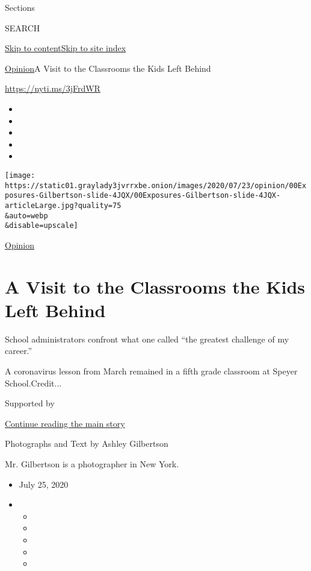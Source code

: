 Sections

SEARCH

\protect\hyperlink{site-content}{Skip to
content}\protect\hyperlink{site-index}{Skip to site index}

\href{/section/opinion}{Opinion}\textbar{}A Visit to the Classrooms the
Kids Left Behind

\url{https://nyti.ms/3jFrdWR}

\begin{itemize}
\item
\item
\item
\item
\item
\end{itemize}

\texttt{[image: https://static01.graylady3jvrrxbe.onion/images/2020/07/23/opinion/00Exposures-Gilbertson-slide-4JQX/00Exposures-Gilbertson-slide-4JQX-articleLarge.jpg?quality=75\\\&auto=webp\\\&disable=upscale]}

\href{/section/opinion}{Opinion}

\hypertarget{a-visit-to-the-classrooms-the-kids-left-behind}{%
\section{A Visit to the Classrooms the Kids Left
Behind}\label{a-visit-to-the-classrooms-the-kids-left-behind}}

School administrators confront what one called ``the greatest challenge
of my career.''

A coronavirus lesson from March remained in a fifth grade classroom at
Speyer School.Credit...

Supported by

\protect\hyperlink{after-sponsor}{Continue reading the main story}

Photographs and Text by Ashley Gilbertson

Mr. Gilbertson is a photographer in New York.

\begin{itemize}
\item
  July 25, 2020
\item
  \begin{itemize}
  \item
  \item
  \item
  \item
  \item
  \end{itemize}
\end{itemize}


